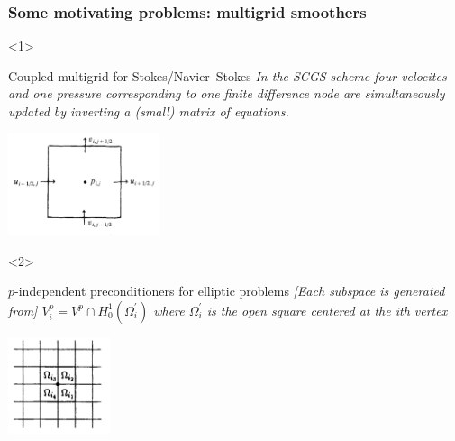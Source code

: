 \documentclass[presentation,aspectratio=43, 10pt]{beamer}
\begin{document}
\begin{frame}[t]
  \frametitle{Some motivating problems: multigrid smoothers}
  \begin{onlyenv}<1>
    \begin{block}{Coupled multigrid for Stokes/Navier--Stokes}
      \emph{In the SCGS scheme four velocites and one pressure
      corresponding to one finite difference node are simultaneously
      updated by inverting a (small) matrix of equations.}

      \begin{center}
        \includegraphics[height=3cm]{vanka}
      \end{center}
      \begin{flushright}
        \textcite{Vanka:1986} \hspace{4em}
      \end{flushright}
    \end{block}
  \end{onlyenv}
  \begin{onlyenv}<2>
    \begin{block}{$p$-independent preconditioners for elliptic problems}
      \emph{[Each subspace is generated from]
      $V_i^p = V^p \cap H^1_0(\Omega_i^{'})$ where $\Omega_i^{'}$ is the open square
      centered at the ith vertex}
      \begin{center}
        \includegraphics[width=3cm]{pavarino}
      \end{center}
      \begin{flushright}
        \textcite{Pavarino:1993} \hspace{4em}
      \end{flushright}
    \end{block}
  \end{onlyenv}


\end{frame}
\end{document}
